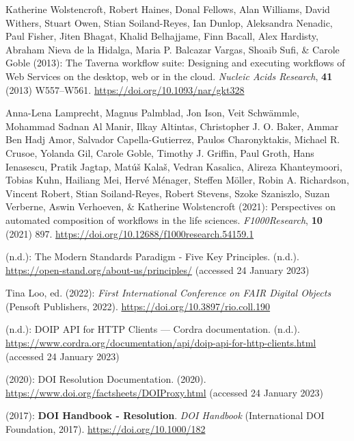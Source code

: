\begin{thebibliography}{9}
Katherine Wolstencroft, Robert Haines, Donal Fellows, Alan Williams,
David Withers, Stuart Owen, Stian Soiland-Reyes, Ian Dunlop, Aleksandra
Nenadic, Paul Fisher, Jiten Bhagat, Khalid Belhajjame, Finn Bacall, Alex
Hardisty, Abraham Nieva de la Hidalga, Maria P. Balcazar Vargas, Shoaib
Sufi, \& Carole Goble (2013): The {Taverna} workflow suite: Designing
and executing workflows of {Web Services} on the desktop, web or in the
cloud. \emph{Nucleic Acids Research}, \textbf{41} (2013) W557--W561.
\url{https://doi.org/10.1093/nar/gkt328}

Anna-Lena Lamprecht, Magnus Palmblad, Jon Ison, Veit Schwämmle, Mohammad
Sadnan Al Manir, Ilkay Altintas, Christopher J. O. Baker, Ammar Ben Hadj
Amor, Salvador Capella-Gutierrez, Paulos Charonyktakis, Michael R.
Crusoe, Yolanda Gil, Carole Goble, Timothy J. Griffin, Paul Groth, Hans
Ienasescu, Pratik Jagtap, Matúš Kalaš, Vedran Kasalica, Alireza
Khanteymoori, Tobias Kuhn, Hailiang Mei, Hervé Ménager, Steffen Möller,
Robin A. Richardson, Vincent Robert, Stian Soiland-Reyes, Robert
Stevens, Szoke Szaniszlo, Suzan Verberne, Aswin Verhoeven, \& Katherine
Wolstencroft (2021): Perspectives on automated composition of workflows
in the life sciences. \emph{F1000Research}, \textbf{10} (2021) 897.
\url{https://doi.org/10.12688/f1000research.54159.1}

(n.d.): The {Modern Standards Paradigm} - {Five Key Principles}. (n.d.).
\url{https://open-stand.org/about-us/principles/} (accessed 24 January
2023)

Tina Loo, ed. (2022): \emph{First {International Conference} on {FAIR
Digital Objects}} ({Pensoft Publishers}, 2022).
\url{https://doi.org/10.3897/rio.coll.190}

(n.d.): {DOIP API} for {HTTP Clients} --- {Cordra} documentation.
(n.d.).
\url{https://www.cordra.org/documentation/api/doip-api-for-http-clients.html}
(accessed 24 January 2023)

(2020): {DOI Resolution Documentation}. (2020).
\url{https://www.doi.org/factsheets/DOIProxy.html} (accessed 24 January
2023)

(2017): \textbf{{DOI Handbook} - {Resolution}}. \emph{{DOI Handbook}}
({International DOI Foundation}, 2017).
\url{https://doi.org/10.1000/182}


\end{thebibliography}
